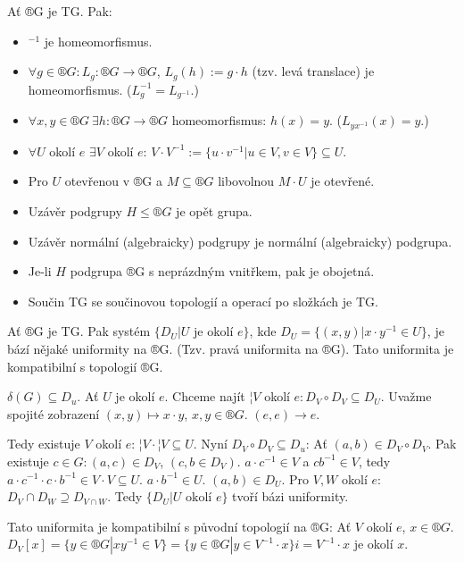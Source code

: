 \documentclass[12pt]{article}                   %
\begin{document}
    \begin{pozorovani}
        Ať ®G je TG. Pak:

        \begin{itemize}
            \item $^{-1}$ je homeomorfismus.
            \item $\forall g \in ®G: L_g: ®G \rightarrow ®G$, $L_g(h) := g·h$ (tzv. levá translace) je homeomorfismus. ($L^{-1}_g = L_{g^{-1}}$.)
            \item $\forall x, y \in ®G\ \exists h: ®G \rightarrow ®G$ homeomorfismus: $h(x) = y$. ($L_{yx^{-1}}(x) = y$.)
            \item $\forall U$ okolí $e$ $\exists V$ okolí $e$: $V·V^{-1} := \{u·v^{-1} | u \in V, v \in V\} \subseteq U$.
            \item Pro $U$ otevřenou v ®G a $M \subseteq ®G$ libovolnou $M·U$ je otevřené.
            \item Uzávěr podgrupy $H ≤ ®G$ je opět grupa.
            \item Uzávěr normální (algebraicky) podgrupy je normální (algebraicky) podgrupa.
            \item Je-li $H$ podgrupa ®G s neprázdným vnitřkem, pak je obojetná.
            \item Součin TG se součinovou topologií a operací po složkách je TG.
        \end{itemize}
    \end{pozorovani}

    \begin{tvrzeni}[Uniformita na TG]
        Ať ®G je TG. Pak systém $\{D_U | U \text{ je okolí } e\}$, kde $D_U = \{(x, y) | x·y^{-1} \in U\}$, je bází nějaké uniformity na ®G. (Tzv. pravá uniformita na ®G). Tato uniformita je kompatibilní s topologií ®G.

        \begin{dukazin}
            $\delta(G) \subseteq D_u$. Ať $U$ je okolí $e$. Chceme najít $¦V$ okolí $e: D_{V} \circ D_{V} \subseteq D_{U}$. Uvažme spojité zobrazení $(x, y) \mapsto x·y$, $x, y \in ®G$. $(e, e) \rightarrow e$.

            Tedy existuje $V$ okolí $e$: $¦V·¦V \subseteq U$. Nyní $D_V \circ D_V \subseteq D_u$: Ať $(a, b) \in D_V \circ D_V$. Pak existuje $c \in G: (a, c) \in D_V$, $(c, b \in D_V)$. $a·c^{-1} \in V$ a $cb^{-1} \in V$, tedy $a·c^{-1}·c·b^{-1} \in V·V \subseteq U$. $a·b^{-1} \in U$. $(a, b) \in D_U$. Pro $V, W$ okolí $e$: $D_V \cap D_W \supseteq D_{V \cap W}$. Tedy $\{D_U | U \text{ okolí } e\}$ tvoří bázi uniformity.

            Tato uniformita je kompatibilní s původní topologií na ®G: Ať $V$ okolí $e$, $x \in ®G$. $D_V[x] = \{y \in ®G | xy^{-1} \in V\} = \{y \in ®G | y \in V^{-1}·x\}i = V^{-1}·x$ je okolí $x$.
        \end{dukazin}
    \end{tvrzeni}
\end{document}
